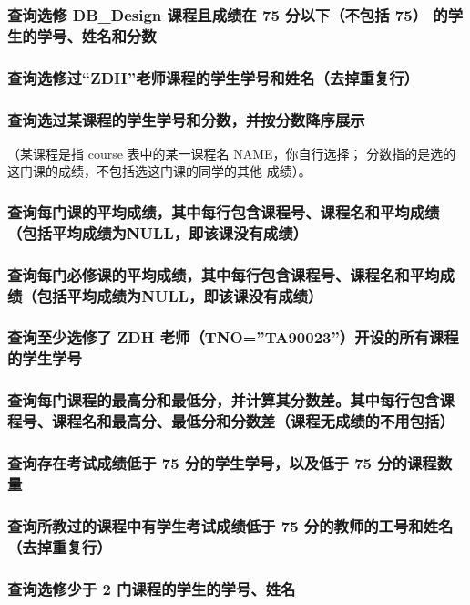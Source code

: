 \documentclass{ctexart}
\begin{document}
\subsubsection{查询选修 DB\_Design 课程且成绩在 75 分以下（不包括 75） 的学生的学号、姓名和分数}
\subsubsection{查询选修过“ZDH”老师课程的学生学号和姓名（去掉重复行）}
\subsubsection{查询选过某课程的学生学号和分数，并按分数降序展示}
（某课程是指 course 表中的某一课程名 NAME，你自行选择； 分数指的是选的这门课的成绩，不包括选这门课的同学的其他
成绩）。
\subsubsection{查询每门课的平均成绩，其中每行包含课程号、课程名和平均成绩（包括平均成绩为NULL，即该课没有成绩）}
\subsubsection{查询每门必修课的平均成绩，其中每行包含课程号、课程名和平均成绩（包括平均成绩为NULL，即该课没有成绩）}
\subsubsection{查询至少选修了 ZDH 老师（TNO=”TA90023”）开设的所有课程的学生学号}
\subsubsection{查询每门课程的最高分和最低分，并计算其分数差。其中每行包含课程号、课程名和最高分、最低分和分数差（课程无成绩的不用包括）}
\subsubsection{查询存在考试成绩低于 75 分的学生学号，以及低于 75 分的课程数量}
\subsubsection{查询所教过的课程中有学生考试成绩低于 75 分的教师的工号和姓名（去掉重复行）}
\subsubsection{查询选修少于 2 门课程的学生的学号、姓名}
\end{document}
